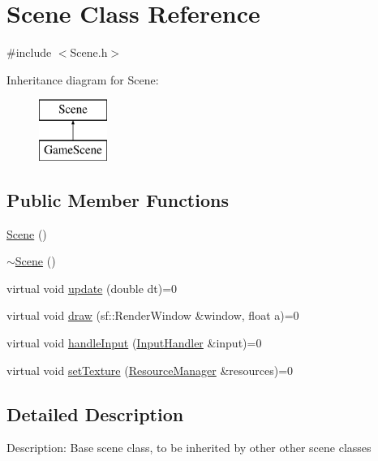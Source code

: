 \hypertarget{class_scene}{}\section{Scene Class Reference}
\label{class_scene}


{\ttfamily \#include $<$Scene.\+h$>$}

Inheritance diagram for Scene\+:\begin{figure}[H]
\begin{center}
\leavevmode
\includegraphics[height=2.000000cm]{class_scene}
\end{center}
\end{figure}
\subsection*{Public Member Functions}
\begin{DoxyCompactItemize}
\item 
\mbox{\hyperlink{class_scene_ad10176d75a9cc0da56626f682d083507}{Scene}} ()
\item 
\mbox{\hyperlink{class_scene_a3b8cec2e32546713915f8c6303c951f1}{$\sim$\+Scene}} ()
\item 
virtual void \mbox{\hyperlink{class_scene_aa02448b66cad257124a21a7b101d2167}{update}} (double dt)=0
\item 
virtual void \mbox{\hyperlink{class_scene_aac0c632404668d9bf71755aaa9c35d51}{draw}} (sf\+::\+Render\+Window \&window, float a)=0
\item 
virtual void \mbox{\hyperlink{class_scene_a8eb235117c46a566f8321ab91b2928d4}{handle\+Input}} (\mbox{\hyperlink{class_input_handler}{Input\+Handler}} \&input)=0
\item 
virtual void \mbox{\hyperlink{class_scene_a72d2dc07bca5b96ebcf88d97356b5b34}{set\+Texture}} (\mbox{\hyperlink{class_resource_manager}{Resource\+Manager}} \&resources)=0
\end{DoxyCompactItemize}


\subsection{Detailed Description}
Description\+: Base scene class, to be inherited by other other scene classes 

